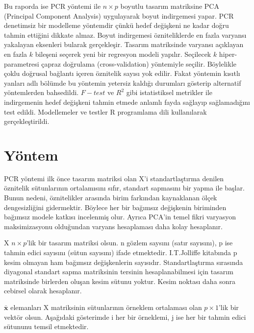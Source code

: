 \documentclass[12pt]{article}
\begin{document}
\vspace{1.5em}

Bu raporda ise PCR yöntemi ile $n \times p$ boyutlu tasarım matriksine PCA (Principal Component Analysis) uygulayarak boyut indirgemesi yapar. PCR denetimsiz bir modelleme yöntemdir çünkü hedef değişkeni ne kadar doğru tahmin ettiğini dikkate almaz. Boyut indirgemesi özniteliklerde en fazla varyansı yakalayan eksenleri bularak gerçekleşir. Tasarım matriksinde varyansı açıklayan en fazla $k$ bileşeni seçerek yeni bir regresyon modeli yapılır. Seçilecek $k$ hiper-parametresi çapraz doğrulama (cross-validation) yöntemiyle seçilir. Böylelikle çoklu doğrusal bağlantı içeren öznitelik sayısı yok edilir. Fakat yöntemin kısıtlı yanları adlı bölümde bu yöntemin yetersiz kaldığı durumları gösterip alternatif yöntemlerden bahsedildi. $F-test$ ve $R^2$ gibi istatistiksel metrikler ile indirgemenin hedef değişkeni tahmin etmede anlamlı fayda sağlayıp sağlamadığını test edildi. Modellemeler ve testler R programlama dili kullanılarak gerçekleştirildi.

\newpage

\section{Yöntem}
PCR yöntemi ilk önce tasarım matriksi olan X'i standartlaştırma denilen öznitelik sütunlarının ortalamısını sıfır, standart sapmasını bir yapma ile başlar. Bunun nedeni, öznitelikler arasında birim farkından kaynaklanan ölçek dengesizliğini gidermektir. Böylece her bir bağımsız değişkenin biriminden bağımsız modele katkısı incelenmiş olur. Ayrıca PCA'in temel fikri varyasyon maksimizasyonu olduğundan varyans hesaplaması daha kolay hesaplanır.

\vspace{1.5em}

X $n \times p$'lik bir tasarım matriksi olsun. n gözlem saysını (satır sayısını), p ise tahmin edici sayısını (sütun sayısını) ifade etmektedir. I.T.Jolliffe \cite{jolliffe} kitabında p kesim olmayan ham bağımsız değişkenlerin sayısıdır. Standartlaştırma sırasında diyagonal standart sapma matriksinin tersinin hesaplanabilmesi için tasarım matriksinde birlerden oluşan kesim sütunu yoktur. Kesim noktası daha sonra cebirsel olarak hesaplanır.

\vspace{1.5em}

$\bar{\textbf{x}}$ elemanları X matriksinin sütunlarının örneklem ortalaması olan $p \times 1$'lik bir vektör olsun. Aşağıdaki gösterimde i her bir örneklemi, j ise her bir tahmin edici sütununu temsil etmektedir.
\end{document}
